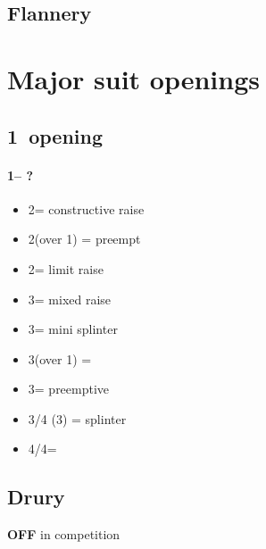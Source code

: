 \documentclass[12pt, a4paper]{report}
\begin{document}
{{        \section*{\colorbox{blue!30}{Flannery}}
         {

        }
    }

    \chapter*{\colorbox{Plum!30}{Major suit openings}}
     {

        \section*{\colorbox{blue!30}{1\major\ opening}}
         {
            \subsubsection*{1\major -- ?}
            \begin{itemize}
                \item 2\major = constructive raise
                \item 2\spades (over 1\hearts) = preempt
                \item 2\nt = limit raise
                \item 3\clubs = mixed raise
                \item 3\diams = mini splinter
                \item 3\hearts (over 1\spades) = \nat\ \inv
                \item 3\major = preemptive
                \item 3\nt/4 (3\spades) = splinter
                \item 4\diams/4\hearts = \major
            \end{itemize}
        }

        \section*{\colorbox{blue!30}{Drury}}
         {
            {\textbf{OFF}} in competition

}}}
\end{document}
